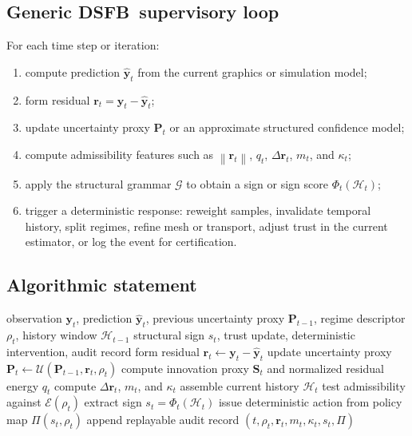 \documentclass[11pt]{article}
\newcommand{\dsfb}{\textsc{DSFB}}
\newcommand{\admiss}{\mathcal{E}}
\newcommand{\grammar}{\mathcal{G}}
\newcommand{\histspace}{\mathcal{H}}
\newcommand{\obs}{\mathbf{y}}
\newcommand{\pred}{\hat{\mathbf{y}}}
\newcommand{\resid}{\mathbf{r}}
\newcommand{\covar}{\mathbf{P}}
\newcommand{\innov}{\mathbf{S}}
\newcommand{\metares}{m}
\newcommand{\norm}[1]{\left\lVert #1 \right\rVert}
\theoremstyle{definition}
\theoremstyle{plain}
\begin{document}
\subsection{Generic \dsfb\ supervisory loop}
For each time step or iteration:
\begin{enumerate}[leftmargin=2.2em]
    \item compute prediction $\pred_t$ from the current graphics or simulation model;
    \item form residual $\resid_t = \obs_t - \pred_t$;
    \item update uncertainty proxy $\covar_t$ or an approximate structured confidence model;
    \item compute admissibility features such as $\norm{\resid_t}$, $q_t$, $\Delta \resid_t$, $\metares_t$, and $\kappa_t$;
    \item apply the structural grammar $\grammar$ to obtain a sign or sign score $\Phi_t(\histspace_t)$;
    \item trigger a deterministic response: reweight samples, invalidate temporal history, split regimes, refine mesh or transport, adjust trust in the current estimator, or log the event for certification.
\end{enumerate}

\subsection{Algorithmic statement}
\begin{algorithm}[H]
\caption{One \dsfb\ supervisory step}
\label{alg:dsfb}
\begin{algorithmic}[1]
\Require observation $\obs_t$, prediction $\pred_t$, previous uncertainty proxy $\covar_{t-1}$, regime descriptor $\rho_t$, history window $\histspace_{t-1}$
\Ensure structural sign $s_t$, trust update, deterministic intervention, audit record
\State form residual $\resid_t \gets \obs_t - \pred_t$
\State update uncertainty proxy $\covar_t \gets \mathcal{U}(\covar_{t-1},\resid_t,\rho_t)$
\State compute innovation proxy $\innov_t$ and normalized residual energy $q_t$
\State compute $\Delta\resid_t$, $\metares_t$, and $\kappa_t$
\State assemble current history $\histspace_t$
\State test admissibility against $\admiss(\rho_t)$
\State extract sign $s_t = \Phi_t(\histspace_t)$
\State issue deterministic action from policy map $\Pi(s_t,\rho_t)$
\State append replayable audit record $(t,\rho_t,\resid_t,\metares_t,\kappa_t,s_t,\Pi)$
\end{algorithmic}
\end{algorithm}
\end{document}

